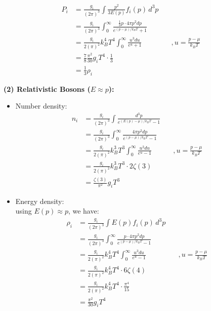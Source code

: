 \begin{foundation}
\begin{itemize}
\begin{align*}
            P_i &= \frac{g_i}{(2\pi)^3} \int \frac{p^2}{3E(p)} f_i(p) \, d^3p \\
                &= \frac{g_i}{(2\pi)^3} \int_0^\infty \frac{\frac{1}{3} p \cdot 4 \pi p^2 dp}{e^{(p - \mu)/k_B T} + 1} \\
                &= \frac{g_i}{2(\pi)^2} k_B^4 T^4 \int_0^\infty \frac{u^3 du}{e^{u} + 1} & \quad , u = \frac{p - \mu}{k_B T} \\
                &= \frac{7}{8}\frac{\pi^2}{30} g_i T^4 \cdot \frac{1}{3} & \\
                &= \frac{1}{3}\rho_i
        \end{align*}
    \end{itemize}

    \textbf{(2) Relativistic Bosons ($E \approx p$):}
     \begin{itemize}
        \item Number density:
        \begin{align*}
            n_i &= \frac{g_i}{(2\pi)^3} \int \frac{d^3p}{e^{(E(p) - \mu)/k_B T} - 1}\\
                &= \frac{g_i}{(2\pi)^3} \int_0^\infty \frac{4 \pi p^2 dp}{e^{(p - \mu)/k_B T} - 1}\\ 
                &= \frac{g_i}{2(\pi)^2} k_B^3 T^3 \int_0^\infty \frac{u^2 du}{e^{u} - 1} & \quad , u = \frac{p - \mu}{k_B T} \\
                &= \frac{g_i}{2(\pi)^2} k_B^3 T^3 \cdot 2\zeta(3) & \\
                &= \frac{\zeta(3)}{\pi^2} g_i T^3
        \end{align*}
        \item Energy density: \\
        using $E(p) \approx p$, we have:
        \begin{align*}
            \rho_i &= \frac{g_i}{(2\pi)^3} \int E(p) f_i(p) \, d^3p \\
                    &= \frac{g_i}{(2\pi)^3} \int_0^\infty \frac{p \cdot 4 \pi p^2 dp}{e^{(p - \mu)/k_B T} - 1} \\
                    &= \frac{g_i}{2(\pi)^2} k_B^4 T^4 \int_0^\infty \frac{u^3 du}{e^{u} - 1} & \quad , u = \frac{p - \mu}{k_B T} \\
                    &= \frac{g_i}{2(\pi)^2} k_B^4 T^4 \cdot 6\zeta(4) & \\
                    &= \frac{g_i}{2(\pi)^2} k_B^4 T^4 \cdot \frac{\pi^4}{15} & \\
                    &= \frac{\pi^2}{30} g_i T^4

\end{align*}
\end{itemize}
\end{foundation}
